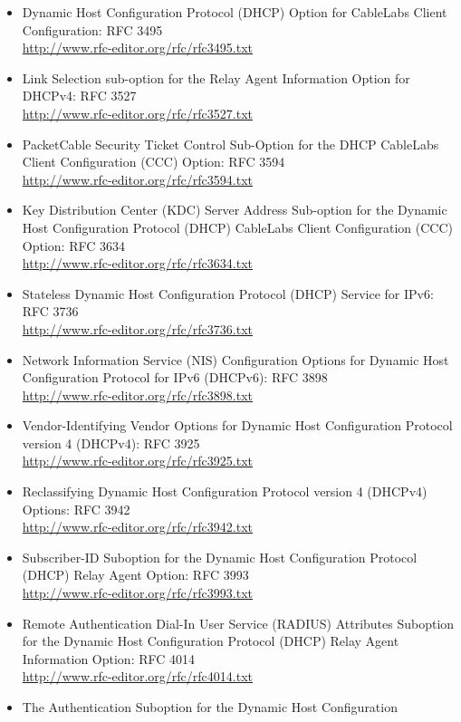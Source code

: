 \begin{itemize}
\begin{itemize}
\begin{itemize}
\item Dynamic Host Configuration Protocol (DHCP) Option for CableLabs 
Client Configuration: RFC 3495\\
\url{http://www.rfc-editor.org/rfc/rfc3495.txt}
\item Link Selection sub-option for the Relay Agent Information 
Option for DHCPv4: RFC 3527\\
\url{http://www.rfc-editor.org/rfc/rfc3527.txt}
\item PacketCable Security Ticket Control Sub-Option for the 
DHCP CableLabs Client Configuration (CCC) Option: RFC 3594\\
\url{http://www.rfc-editor.org/rfc/rfc3594.txt}
\item Key Distribution Center (KDC) Server Address Sub-option for the 
Dynamic Host Configuration Protocol (DHCP) CableLabs Client 
Configuration (CCC) Option: RFC 3634\\
\url{http://www.rfc-editor.org/rfc/rfc3634.txt}
\item Stateless Dynamic Host Configuration Protocol (DHCP) Service for 
IPv6: RFC 3736\\
\url{http://www.rfc-editor.org/rfc/rfc3736.txt}
\item Network Information Service (NIS) Configuration Options for 
Dynamic Host Configuration Protocol for IPv6 (DHCPv6): RFC 3898\\
\url{http://www.rfc-editor.org/rfc/rfc3898.txt}
\item Vendor-Identifying Vendor Options for Dynamic Host Configuration 
Protocol version 4 (DHCPv4): RFC 3925\\
\url{http://www.rfc-editor.org/rfc/rfc3925.txt}
\item Reclassifying Dynamic Host Configuration Protocol version 4 
(DHCPv4) Options: RFC 3942\\
\url{http://www.rfc-editor.org/rfc/rfc3942.txt}
\item Subscriber-ID Suboption for the Dynamic Host Configuration 
Protocol (DHCP) Relay Agent Option: RFC 3993\\
\url{http://www.rfc-editor.org/rfc/rfc3993.txt}
\item Remote Authentication Dial-In User Service (RADIUS) Attributes 
Suboption for the Dynamic Host Configuration Protocol (DHCP) Relay 
Agent Information Option: RFC 4014\\
\url{http://www.rfc-editor.org/rfc/rfc4014.txt}
\item The Authentication Suboption for the Dynamic Host Configuration 

\end{itemize}
\end{itemize}
\end{itemize}

